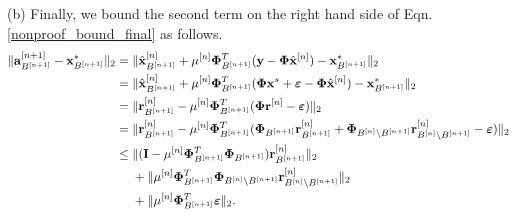 \documentclass[article]{imsart}
\begin{document}
(b) Finally, we bound the second term on the right hand side of Eqn. \ref{nonproof_bound_final} as follows.
\begin{equation}\label{last_term_main_theorem}
    \begin{split}
       \|{{\bf a}}_{B^{[n+1]}}^{[n+1]} - {{\bf x}}_{B^{[n+1]}}^{*} \|_2 &= \|{\hat{\bf x}}_{B^{[n+1]}}^{[n]} + \mu^{[n]}{\bf \Phi}_{B^{[n+1]}}^T({\bf y}-{\bf \Phi} \hat{{\bf x}}^{[n]}) - {{\bf x}}_{B^{[n+1]}}^{*} \|_2\\
        &= \|{\hat{\bf x}}_{B^{[n+1]}}^{[n]} + \mu^{[n]}{\bf \Phi}_{B^{[n+1]}}^T({\bf \Phi} {\bf x}^s + \boldsymbol{\varepsilon}-{\bf \Phi} \hat{\bf x}^{[n]}) - {{\bf x}}_{B^{[n+1]}}^{*} \|_2\\
         &= \|{{\bf r}}_{B^{[n+1]}}^{[n]} - \mu^{[n]}{\bf \Phi}_{B^{[n+1]}}^T({\bf \Phi} {\bf r}^{[n]}  -\boldsymbol{\varepsilon}) \|_2\\
         &= \|{{\bf r}}_{B^{[n+1]}}^{[n]} - \mu^{[n]}{\bf \Phi}_{B^{[n+1]}}^T({\bf \Phi}_{B^{[n+1]}}{\bf r}^{[n]}_{B^{[n+1]}} + {\bf \Phi}_{B^{[n]}\backslash B^{[n+1]}}{\bf r}^{[n]}_{B^{[n]}\backslash B^{[n+1]}}  - \boldsymbol{\varepsilon}) \|_2\\
         &\leq \|({\boldsymbol{\rm I}} - \mu^{[n]}{\bf \Phi}_{B^{[n+1]}}^T{\bf \Phi}_{B^{[n+1]}}){\bf r}^{[n]}_{B^{[n+1]}}\|_2\\
         &\ \ \ \ + \|\mu^{[n]}{\bf \Phi}_{B^{[n+1]}}^T{\bf \Phi}_{B^{[n]}\backslash B^{[n+1]}}{\bf r}^{[n]}_{B^{[n]}\backslash B^{[n+1]}}\|_2\\
         &\ \ \ \ + \|\mu^{[n]}{\bf \Phi}_{B^{[n+1]}}^T\boldsymbol{\varepsilon}\|_2.
    \end{split}
\end{equation}
\end{document}
